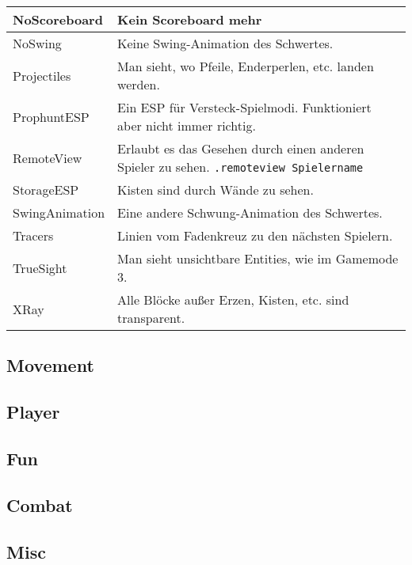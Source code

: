 \begin{longtable}{p{3cm}|p{10cm}}
\hline
NoScoreboard & Kein Scoreboard mehr \\
\hline
NoSwing & Keine Swing-Animation des Schwertes. \\
\hline
Projectiles & Man sieht, wo Pfeile, Enderperlen, etc. landen werden. \\
\hline
ProphuntESP & Ein ESP für Versteck-Spielmodi. Funktioniert aber nicht immer richtig. \\
\hline
RemoteView & Erlaubt es das Gesehen durch einen anderen Spieler zu sehen. \texttt{.remoteview Spielername} \\
\hline
\rowcolor{lime!50}StorageESP & Kisten sind durch Wände zu sehen. \\
\hline
SwingAnimation & Eine andere Schwung-Animation des Schwertes. \\
\hline
Tracers & Linien vom Fadenkreuz zu den nächsten Spielern. \\
\hline
TrueSight & Man sieht unsichtbare Entities, wie im Gamemode 3. \\
\hline
\rowcolor{lime!50}XRay & Alle Blöcke außer Erzen, Kisten, etc. sind transparent. \\
\end{longtable}

\subsection{Movement}

\subsection{Player}

\subsection{Fun}

\subsection{Combat}

\subsection{Misc}